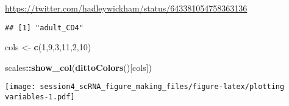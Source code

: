 \documentclass[
]{article}
\newenvironment{Shaded}{\begin{snugshade}}{\end{snugshade}}
\newcommand{\DecValTok}[1]{\textcolor[rgb]{0.00,0.00,0.81}{#1}}
\newcommand{\FunctionTok}[1]{\textcolor[rgb]{0.13,0.29,0.53}{\textbf{#1}}}
\newcommand{\NormalTok}[1]{#1}
\newcommand{\OtherTok}[1]{\textcolor[rgb]{0.56,0.35,0.01}{#1}}
\newcommand{\SpecialCharTok}[1]{\textcolor[rgb]{0.81,0.36,0.00}{\textbf{#1}}}
\begin{document}
\url{https://twitter.com/hadleywickham/status/643381054758363136}

\begin{Shaded}
\end{Shaded}

\begin{verbatim}
## [1] "adult_CD4"
\end{verbatim}

\begin{Shaded}
\begin{Highlighting}[]
\NormalTok{cols }\OtherTok{\textless{}{-}} \FunctionTok{c}\NormalTok{(}\DecValTok{1}\NormalTok{,}\DecValTok{9}\NormalTok{,}\DecValTok{3}\NormalTok{,}\DecValTok{11}\NormalTok{,}\DecValTok{2}\NormalTok{,}\DecValTok{10}\NormalTok{)}

\NormalTok{scales}\SpecialCharTok{::}\FunctionTok{show\_col}\NormalTok{(}\FunctionTok{dittoColors}\NormalTok{()[cols])}
\end{Highlighting}
\end{Shaded}

\texttt{[image: session4\_scRNA\_figure\_making\_files/figure-latex/plotting variables-1.pdf]}
\end{document}
